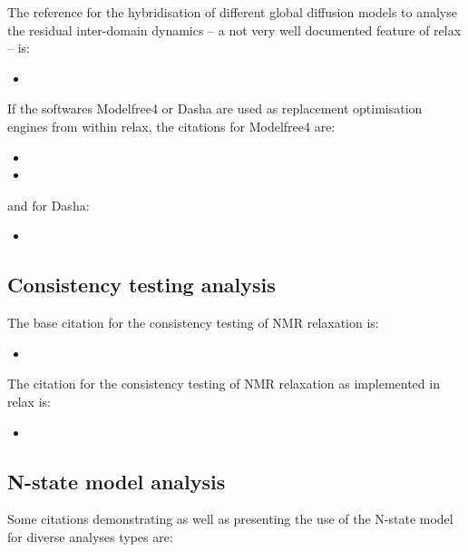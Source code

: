 The reference for the hybridisation of different global diffusion models to analyse the residual inter-domain dynamics -- a not very well documented feature of relax -- is:

\begin{itemize}
\item {}
\end{itemize}

If the softwares Modelfree4 or Dasha are used as replacement optimisation engines from within relax, the citations for Modelfree4 are:

\begin{itemize}
\item {}
\item {}
\end{itemize}

and for Dasha:

\begin{itemize}
\item {}
\end{itemize}



\subsection{Consistency testing analysis}

The base citation for the consistency testing of NMR relaxation is:

\begin{itemize}
\item {}
\end{itemize}

The citation for the consistency testing of NMR relaxation as implemented in relax is:

\begin{itemize}
\item {}
\end{itemize}



\subsection{N-state model analysis}

Some citations demonstrating as well as presenting the use of the N-state model for diverse analyses types are:

